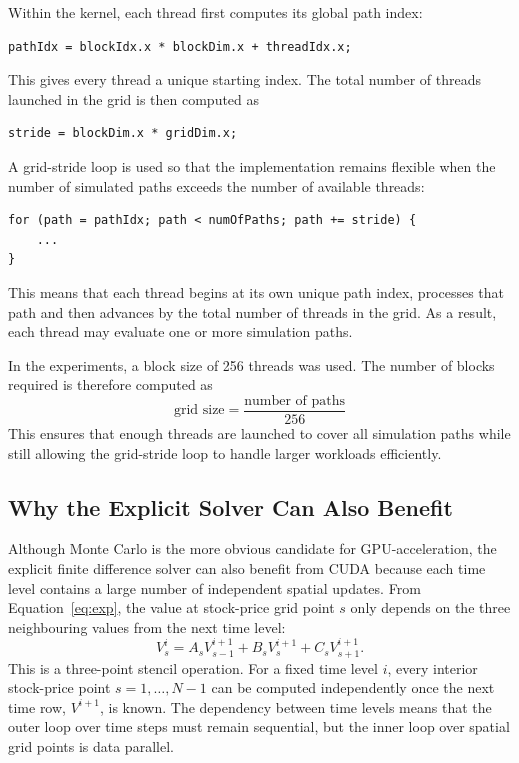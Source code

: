 \documentclass[11pt]{report}
\begin{document}
Within the kernel, each thread first computes its global path index:
\begin{verbatim}
pathIdx = blockIdx.x * blockDim.x + threadIdx.x;
\end{verbatim}
This gives every thread a unique starting index. The total number of threads launched in the grid is then computed as
\begin{verbatim}
stride = blockDim.x * gridDim.x;
\end{verbatim}
A grid-stride loop is used so that the implementation remains flexible when the number of simulated paths exceeds the number of available threads:
\begin{verbatim}
for (path = pathIdx; path < numOfPaths; path += stride) {
    ...
}
\end{verbatim}
This means that each thread begins at its own unique path index, 
processes that path and then advances by the total number of threads in the grid. 
As a result, each thread may evaluate one or more simulation paths.

In the experiments, a block size of 256 threads was used. 
The number of blocks required is therefore computed as
\begin{equation}
    \text{grid size} =  \frac{\text{number of paths}}{256}
\end{equation}
This ensures that enough threads are launched to cover all 
simulation paths while still allowing the grid-stride 
loop to handle larger workloads efficiently.

\subsection{Why the Explicit Solver Can Also Benefit}\label{sec:ExplicitGPU}

Although Monte Carlo is the more obvious candidate for GPU-acceleration, 
the explicit finite difference solver can also benefit 
from CUDA because each time level contains a large
number of independent spatial updates. From Equation~\ref{eq:exp}, 
the value at stock-price grid point $s$ only depends on the 
three neighbouring values from the next time level:
\begin{equation}
V_s^i = A_s V_{s-1}^{i+1} + B_s V_s^{i+1} + C_s V_{s+1}^{i+1}.
\label{eg:stencil}
\end{equation}
This is a three-point stencil operation. 
For a fixed time level $i$, 
every interior stock-price point $s=1,\ldots,N-1$ can be computed 
independently once the next time row, $V^{i+1}$, is
known. The dependency between time levels means 
that the outer loop over 
time steps must remain sequential, but the inner 
loop over spatial grid points is data parallel.
\end{document}

